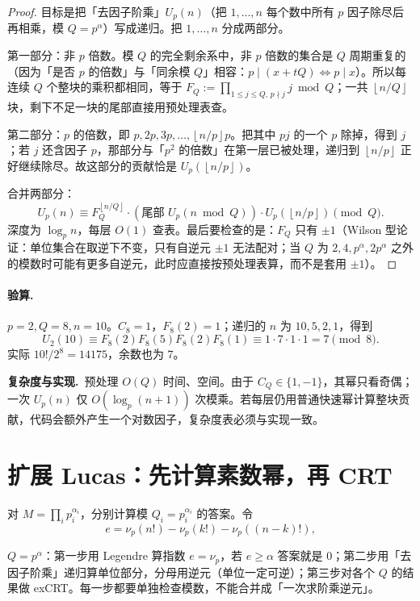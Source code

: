 \documentclass[UTF8,a4paper,11pt,oneside,openany,fontset=fandol]{ctexbook}
\theoremstyle{definition}
\newcommand{\floor}[1]{\left\lfloor #1\right\rfloor}
\newcommand{\cost}{\par\noindent\textbf{复杂度与实现.}\ }
\begin{document}
\begin{proof}
目标是把「去因子阶乘」$U_p(n)$（把 $1,\ldots,n$ 每个数中所有 $p$ 因子除尽后再相乘，模 $Q=p^\alpha$）写成递归。把 $1,\ldots,n$ 分成两部分。

第一部分：非 $p$ 倍数。模 $Q$ 的完全剩余系中，非 $p$ 倍数的集合是 $Q$ 周期重复的（因为「是否 $p$ 的倍数」与「同余模 $Q$」相容：$p\mid(x+tQ)\iff p\mid x$）。所以每连续 $Q$ 个整块的乘积都相同，等于 $F_Q:=\prod_{1\le j\le Q,\,p\nmid j}j\bmod Q$；一共 $\floor{n/Q}$ 块，剩下不足一块的尾部直接用预处理表查。

第二部分：$p$ 的倍数，即 $p,2p,3p,\ldots,\floor{n/p}p$。把其中 $pj$ 的一个 $p$ 除掉，得到 $j$；若 $j$ 还含因子 $p$，那部分与「$p^2$ 的倍数」在第一层已被处理，递归到 $\floor{n/p}$ 正好继续除尽。故这部分的贡献恰是 $U_p(\floor{n/p})$。

合并两部分：
\[
 U_p(n)\equiv F_Q^{\floor{n/Q}}\cdot(\text{尾部 }U_p(n\bmod Q))\cdot U_p(\floor{n/p})\pmod Q .
\]
深度为 $\log_p n$，每层 $O(1)$ 查表。最后要检查的是：$F_Q$ 只有 $\pm1$（Wilson 型论证：单位集合在取逆下不变，只有自逆元 $\pm1$ 无法配对；当 $Q$ 为 $2,4,p^\alpha,2p^\alpha$ 之外的模数时可能有更多自逆元，此时应直接按预处理表算，而不是套用 $\pm1$）。
\end{proof}
\paragraph{验算.} $p=2,Q=8,n=10$。$C_8=1$，$F_8(2)=1$；递归的 $n$ 为 $10,5,2,1$，得到
\[
 U_2(10)\equiv F_8(2)F_8(5)F_8(2)F_8(1)
 \equiv1\cdot7\cdot1\cdot1=7\pmod8.
\]
实际 $10!/2^8=14175$，余数也为 $7$。
\cost 预处理 $O(Q)$ 时间、空间。由于 $C_Q\in\{1,-1\}$，其幂只看奇偶；一次 $U_p(n)$ 仅 $O(\log_p(n+1))$ 次模乘。若每层仍用普通快速幂计算整块贡献，代码会额外产生一个对数因子，复杂度表必须与实现一致。


\section{扩展 Lucas：先计算素数幂，再 CRT}
对 $M=\prod_i p_i^{\alpha_i}$，分别计算模 $Q_i=p_i^{\alpha_i}$ 的答案。令
\[
 e=\nu_p(n!)-\nu_p(k!)-\nu_p((n-k)!),
\]

\begin{tip}[三步流程]
$Q=p^\alpha$：第一步用 Legendre 算指数 $e=\nu_p$，若 $e\ge\alpha$ 答案就是 $0$；第二步用「去因子阶乘」递归算单位部分，分母用逆元（单位一定可逆）；第三步对各个 $Q$ 的结果做 exCRT。每一步都要单独检查模数，不能合并成「一次求阶乘逆元」。
\end{tip}
\end{document}
